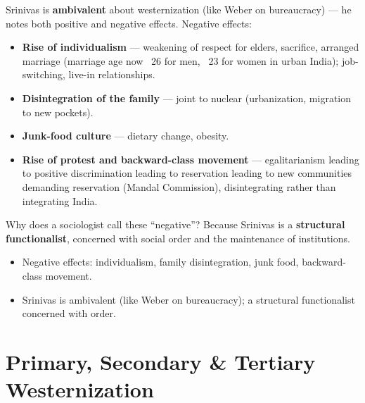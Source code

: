 Srinivas is \textbf{ambivalent} about westernization (like Weber on bureaucracy) --- he notes both positive and negative effects. Negative effects:
\begin{itemize}
\item \textbf{Rise of individualism} --- weakening of respect for elders, sacrifice, arranged marriage (marriage age now ~26 for men, ~23 for women in urban India); job-switching, live-in relationships.
\item \textbf{Disintegration of the family} --- joint to nuclear (urbanization, migration to new pockets).
\item \textbf{Junk-food culture} --- dietary change, obesity.
\item \textbf{Rise of protest and backward-class movement} --- egalitarianism leading to positive discrimination leading to reservation leading to new communities demanding reservation (Mandal Commission), disintegrating rather than integrating India.
\end{itemize}

\begin{CriticalPoint}
Why does a sociologist call these ``negative''? Because Srinivas is a \textbf{structural functionalist}, concerned with social order and the maintenance of institutions.
\end{CriticalPoint}

\begin{QuickRevision}
\begin{itemize}
\item Negative effects: individualism, family disintegration, junk food, backward-class movement.
\item Srinivas is ambivalent (like Weber on bureaucracy); a structural functionalist concerned with order.
\end{itemize}
\end{QuickRevision}

\section{Primary, Secondary \& Tertiary Westernization}


